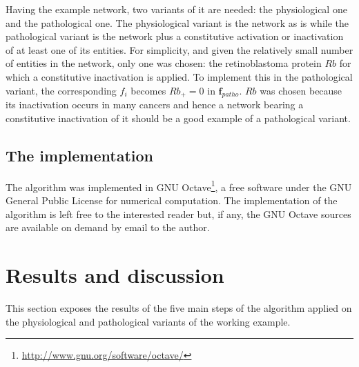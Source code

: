 \documentclass[oneside,a4paper,onecolumn,notitlepage]{article}
\begin{document}
Having the example network, two variants of it are needed: the physiological one and the pathological one. The physiological variant is the network as is while the pathological variant is the network plus a constitutive activation or inactivation of at least one of its entities. For simplicity, and given the relatively small number of entities in the network, only one was chosen: the retinoblastoma protein $Rb$ for which a constitutive inactivation is applied. To implement this in the pathological variant, the corresponding $f_i$ becomes $Rb_{+}=0$ in $\boldsymbol{f}_{patho}$.
$Rb$ was chosen because its inactivation occurs in many cancers \cite{sherr2002rb} and hence a network bearing a constitutive inactivation of it should be a good example of a pathological variant.

\subsection*{The implementation}
The algorithm was implemented in GNU Octave\footnote{\url{http://www.gnu.org/software/octave/}}, a free software under the GNU General Public License for numerical computation. The implementation of the algorithm is left free to the interested reader but, if any, the GNU Octave sources are available on demand by email to the author.

\section*{Results and discussion}
This section exposes the results of the five main steps of the algorithm applied on the physiological and pathological variants of the working example.
\end{document}
